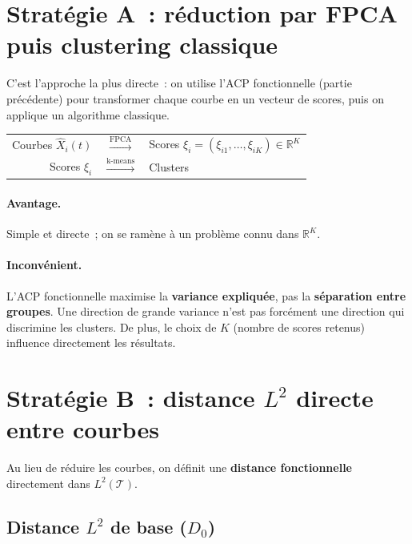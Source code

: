 \documentclass[11pt, a4paper]{article}
\newcommand{\R}{\mathbb{R}}
\newcommand{\Ltwo}{L^2(\mathcal{T})}
\begin{document}
\section{Strat\'egie A~: r\'eduction par FPCA puis clustering classique}

C'est l'approche la plus directe~: on utilise l'ACP fonctionnelle (partie pr\'ec\'edente) pour transformer chaque courbe en un vecteur de scores, puis on applique un algorithme classique.

\medskip
\begin{center}
\begin{tabular}{rcl}
    Courbes $\hat{X}_i(t)$ & $\xrightarrow{\text{FPCA}}$ & Scores $\xi_i = (\xi_{i1}, \ldots, \xi_{iK}) \in \R^K$ \\
    Scores $\xi_i$ & $\xrightarrow{\text{k-means}}$ & Clusters \\
\end{tabular}
\end{center}

\paragraph{Avantage.} Simple et directe~; on se ram\`ene \`a un probl\`eme connu dans $\R^K$.

\paragraph{Inconv\'enient.} L'ACP fonctionnelle maximise la \textbf{variance expliqu\'ee}, pas la \textbf{s\'eparation entre groupes}. Une direction de grande variance n'est pas forc\'ement une direction qui discrimine les clusters. De plus, le choix de $K$ (nombre de scores retenus) influence directement les r\'esultats.

\section{Strat\'egie B~: distance $L^2$ directe entre courbes}

Au lieu de r\'eduire les courbes, on d\'efinit une \textbf{distance fonctionnelle} directement dans $\Ltwo$.

\subsection{Distance $L^2$ de base ($D_0$)}
\end{document}
